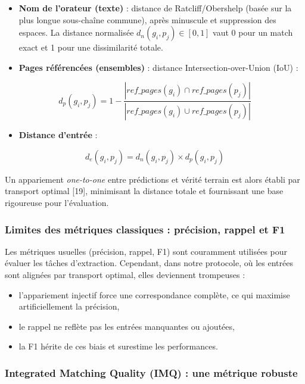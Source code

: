 \begin{itemize}
\item \textbf{Nom de l’orateur (texte)} : distance de Ratcliff/Obershelp (basée sur la plus longue sous-chaîne commune), après minuscule et suppression des espaces. La distance normalisée $d_n(g_i, p_j) \in [0,1]$ vaut 0 pour un match exact et 1 pour une dissimilarité totale.

\item \textbf{Pages référencées (ensembles)} : distance Intersection-over-Union (IoU) :

\end{itemize}
$$
d_p(g_i, p_j) = 1 - \frac{|ref\_pages(g_i) \cap ref\_pages(p_j)|}{|ref\_pages(g_i) \cup ref\_pages(p_j)|}
$$

\begin{itemize}
\item \textbf{Distance d’entrée} :

\end{itemize}
$$
d_e(g_i, p_j) = d_n(g_i, p_j) \times d_p(g_i, p_j)
$$

Un appariement \emph{one-to-one} entre prédictions et vérité terrain est alors établi par transport optimal [19], minimisant la distance totale et fournissant une base rigoureuse pour l’évaluation.

\subsubsection{Limites des métriques classiques : précision, rappel et F1}

Les métriques usuelles (précision, rappel, F1) sont couramment utilisées pour évaluer les tâches d’extraction. Cependant, dans notre protocole, où les entrées sont alignées par transport optimal, elles deviennent trompeuses :

\begin{itemize}
\item l’appariement injectif force une correspondance complète, ce qui maximise artificiellement la précision,
\item le rappel ne reflète pas les entrées manquantes ou ajoutées,
\item la F1 hérite de ces biais et surestime les performances.

\end{itemize}
\subsubsection{Integrated Matching Quality (IMQ) : une métrique robuste}

